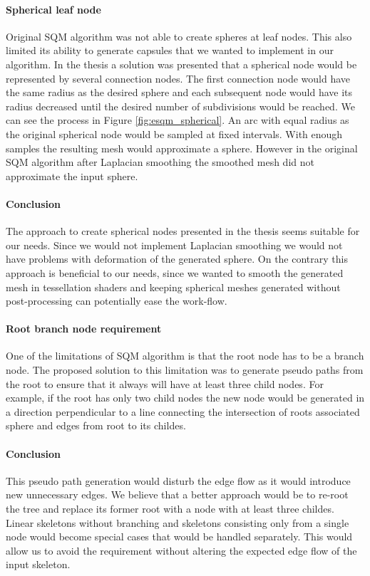\paragraph{Spherical leaf node}
Original SQM algorithm was not able to create spheres at leaf nodes. This also limited its ability to generate capsules that we wanted to implement in our algorithm. In the thesis a solution was presented that a spherical node would be represented by several connection nodes. The first connection node would have the same radius as the desired sphere and each subsequent node would have its radius decreased until the desired number of subdivisions would be reached. We can see the process in Figure \ref{fig:esqm_spherical}. An arc with equal radius as the original spherical node would be sampled at fixed intervals. With enough samples the resulting mesh would approximate a sphere. However in the original SQM algorithm after Laplacian smoothing the smoothed mesh did not approximate the input sphere.

\paragraph{Conclusion}
The approach to create spherical nodes presented in the thesis seems suitable for our needs. Since we would not implement Laplacian smoothing we would not have problems with deformation of the generated sphere. On the contrary this approach is beneficial to our needs, since we wanted to smooth the generated mesh in tessellation shaders and keeping spherical meshes generated without post-processing can potentially ease the work-flow.

\paragraph{Root branch node requirement}
One of the limitations of SQM algorithm is that the root node has to be a branch node. The proposed solution to this limitation was to generate pseudo paths from the root to ensure that it always will have at least three child nodes. For example, if the root has only two child nodes the new node would be generated in a direction perpendicular to a line connecting the intersection of roots associated sphere and edges from root to its childes.

\paragraph{Conclusion}
This pseudo path generation would disturb the edge flow as it would introduce new unnecessary edges. We believe that a better approach would be to re-root the tree and replace its former root with a node with at least three childes. Linear skeletons without branching and skeletons consisting only from a single node would become special cases that would be handled separately. This would allow us to avoid the requirement without altering the expected edge flow of the input skeleton.